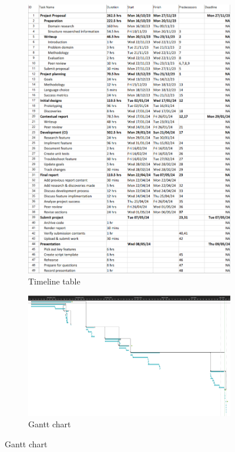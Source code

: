 \begin{figure}
    \centering
    \caption{Project Timeline}
    \label{fig:ProjectTimeline}
    \begin{subfigure}[t]{0.5\textwidth}
        \caption{Timeline table}
        \label{fig:ProjectTimelineChart}
        \includegraphics[clip, width=0.5\textheight]{../TimelineChart.png}
    \end{subfigure}
    \begin{subfigure}[b]{0.5\textwidth}
        \caption{Gantt chart}
        \label{fig:GanttChart}
        \includegraphics[clip, width=0.5\textheight]{Figures/GanttChart.png}
    \end{subfigure}
\end{figure}

